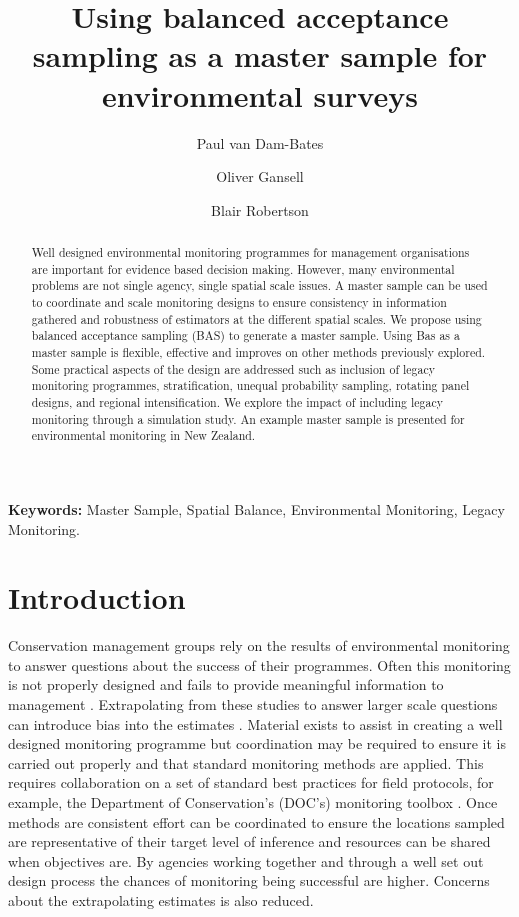 \documentclass[titlepage]{article}
\title{Using balanced acceptance sampling as a master sample for environmental surveys}
\author[1,*]{Paul van Dam-Bates}
\author[2]{Oliver Gansell}
\author[3]{Blair Robertson}
\affil[1]{%
	Department of Conservation, Christchurch, New Zealand 
}
\affil[2]{%
	Department of Conservation, Hamilton, New Zealand}
\affil[3]{%
	University of Canterbury, Christchurch, New Zealand}
\affil[*]{Corresponding author: Paul van Dam-Bates, pbates@doc.govt.nz}
\begin{document}
\maketitle


\begin{abstract}
Well designed environmental monitoring programmes for management organisations are important for evidence based decision making. However, many environmental problems are not single agency, single spatial scale issues. A master sample can be used to coordinate and scale monitoring designs to ensure consistency in information gathered and robustness of estimators at the different spatial scales. We propose using balanced acceptance sampling (BAS) to generate a master sample. Using Bas as a master sample is flexible, effective and improves on other methods previously explored. Some practical aspects of the design are addressed such as inclusion of legacy monitoring programmes, stratification, unequal probability sampling, rotating panel designs, and regional intensification. We explore the impact of including legacy monitoring through a simulation study. An example master sample is presented for environmental monitoring in New Zealand.

\end{abstract}

{\bf Keywords:} Master Sample, Spatial Balance, Environmental Monitoring, Legacy Monitoring.

\section{Introduction}
Conservation management groups rely on the results of environmental monitoring to answer questions about the success of their programmes. Often this monitoring is not properly designed and fails to provide meaningful information to management \citep{Legg2006, Nichols2006, Field2007}. Extrapolating from these studies to answer larger scale questions can introduce bias into the estimates \citep{Peterson1999}. Material exists to assist in creating a well designed monitoring programme \citep{Gitzen2012, Reynolds2016, Vos2000} but coordination may be required to ensure it is carried out properly and that standard monitoring methods are applied. This requires collaboration on a set of standard best practices for field protocols, for example, the Department of Conservation's (DOC's) monitoring toolbox \citep{DOC}. Once methods are consistent effort can be coordinated to ensure the locations sampled are representative of their target level of inference and resources can be shared when objectives are. By agencies working together and through a well set out design process the chances of monitoring being successful are higher. Concerns about the extrapolating estimates is also reduced.
\end{document}
